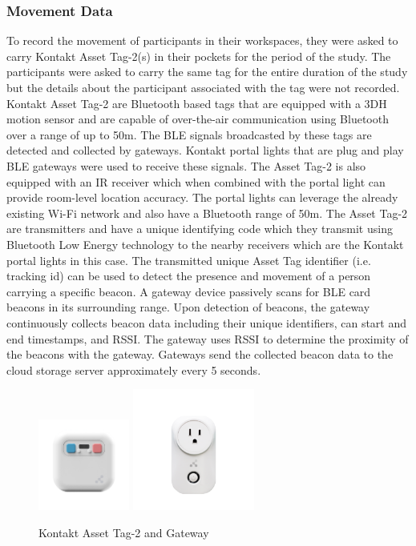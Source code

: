 \documentclass[acmtog]{acmart}
\begin{document}
\subsubsection{Movement Data}
To record the movement of participants in their workspaces, they were asked to carry Kontakt Asset Tag-2(s) in their pockets for the period of the study. The participants were asked to carry the same tag for the entire duration of the study but the details about the participant associated with the tag were not recorded. Kontakt Asset Tag-2 are Bluetooth based tags that are equipped with a 3DH motion sensor and are capable of over-the-air communication using Bluetooth over a range of up to 50m. The BLE signals broadcasted by these tags are detected and collected by gateways. Kontakt portal lights that are plug and play BLE gateways were used to receive these signals. The Asset Tag-2 is also equipped with an IR receiver which when combined with the portal light can provide room-level location accuracy. The portal lights can leverage the already existing Wi-Fi network and also have a Bluetooth range of 50m. 
The Asset Tag-2 are transmitters and have a unique identifying code which they transmit using Bluetooth Low Energy technology to the nearby receivers which are the Kontakt portal lights in this case. The transmitted unique Asset Tag identifier (i.e. tracking id) can be used to detect the presence and movement of a person carrying a specific beacon. A gateway device passively scans for BLE card beacons in its surrounding range. Upon detection of beacons, the gateway continuously collects beacon data including their unique identifiers, can start and end timestamps, and RSSI. The gateway uses RSSI to determine the proximity of the beacons with the gateway. Gateways send the collected beacon data to the cloud storage server approximately every 5 seconds.
\begin{figure}[h]
  \centering
  \includegraphics[width=3cm,height=3cm,keepaspectratio]{Asset-Tag-493x0-c-default}
  \includegraphics[width=4cm,height=4cm,keepaspectratio]{Group-15446-493x0-c-default}
  \caption{Kontakt Asset Tag-2 and Gateway}
  \end{figure}
\end{document}
